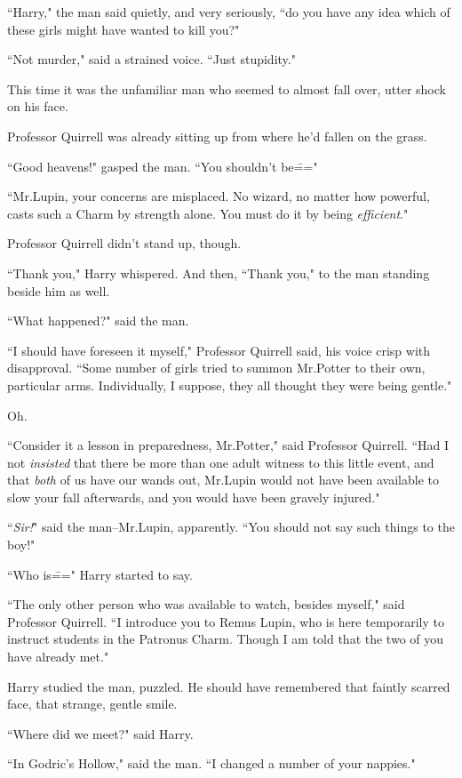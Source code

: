 ``Harry," the man said quietly, and very seriously, ``do you have any idea which of these girls might have wanted to kill you?"

``Not murder," said a strained voice. ``Just stupidity."

This time it was the unfamiliar man who seemed to almost fall over, utter shock on his face.

Professor Quirrell was already sitting up from where he'd fallen on the grass.

``Good heavens!" gasped the man. ``You shouldn't be\==="

``Mr.\?Lupin, your concerns are misplaced. No wizard, no matter how powerful, casts such a Charm by strength alone. You must do it by being \emph{efficient}."

Professor Quirrell didn't stand up, though.

``Thank you," Harry whispered. And then, ``Thank you," to the man standing beside him as well.

``What happened?" said the man.

``I should have foreseen it myself," Professor Quirrell said, his voice crisp with disapproval. ``Some number of girls tried to summon Mr.\?Potter to their own, particular arms. Individually, I suppose, they all thought they were being gentle."

Oh.

``Consider it a lesson in preparedness, Mr.\?Potter," said Professor Quirrell. ``Had I not \emph{insisted} that there be more than one adult witness to this little event, and that \emph{both} of us have our wands out, Mr.\?Lupin would not have been available to slow your fall afterwards, and you would have been gravely injured."

``\emph{Sir!}" said the man\---Mr.\?Lupin, apparently. ``You should not say such things to the boy!"

``Who is\===" Harry started to say.

``The only other person who was available to watch, besides myself," said Professor Quirrell. ``I introduce you to Remus Lupin, who is here temporarily to instruct students in the Patronus Charm. Though I am told that the two of you have already met."

Harry studied the man, puzzled. He should have remembered that faintly scarred face, that strange, gentle smile.

``Where did we meet?" said Harry.

``In Godric's Hollow," said the man. ``I changed a number of your nappies."

